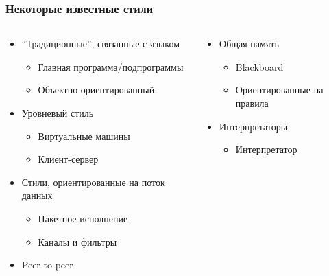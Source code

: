 \documentclass[xetex,mathserif,serif]{beamer}
\begin{document}
    \begin{frame}
        \frametitle{Некоторые известные стили}
        \begin{columns}
            \begin{column}{0.5\textwidth}
                \begin{itemize}
                    \item ``Традиционные'', связанные с языком
                    \begin{itemize}
                        \item Главная программа/подпрограммы
                        \item Объектно-ориентированный
                    \end{itemize}
                    \item Уровневый стиль
                    \begin{itemize}
                        \item Виртуальные машины
                        \item Клиент-сервер
                    \end{itemize}
                    \item Стили, ориентированные на поток данных
                    \begin{itemize}
                        \item Пакетное исполнение
                        \item Каналы и фильтры
                    \end{itemize}
                    \item Peer-to-peer
                \end{itemize}
            \end{column}
            \begin{column}{0.5\textwidth}
                \begin{itemize}
                    \item Общая память
                    \begin{itemize}
                        \item Blackboard
                        \item Ориентированные на правила
                    \end{itemize}
                    \item Интерпретаторы
                    \begin{itemize}
                        \item Интерпретатор

\end{itemize}
\end{itemize}
\end{column}
\end{columns}
\end{frame}
\end{document}
